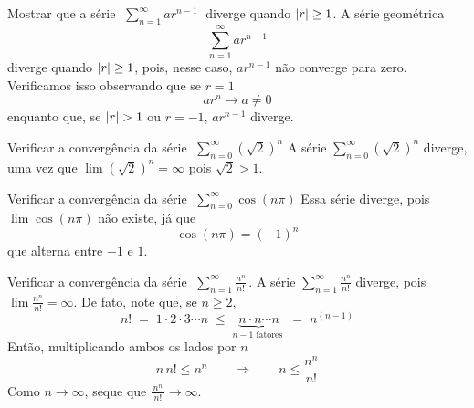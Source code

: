 \begin{example}
  Mostrar que a série
  \(\;
    \sum_{n=1}^\infty ar^{n-1}
  \;\)
  diverge quando $\abs{r}\geq 1$.
  \solution
  A série geométrica
  \[
    \sum_{n=1}^\infty ar^{n-1}
  \]
  diverge quando $\abs{r}\geq 1$, pois, nesse caso, $ar^{n-1}$ não converge para zero.
  Verificamos isso observando que se $r=1$
  \[
    ar^n \to a \neq 0
  \]
  enquanto que, se $\abs{r}>1$ ou $r=-1$, $ar^{n-1}$ diverge.
\end{example}

\begin{example}
  Verificar a convergência da série
  \(\;
    \sum_{n=0}^\infty \left(\sqrt{2}\right)^n
  \)
  \solution
  A série
  \(
    \sum_{n=0}^\infty \left(\sqrt{2}\right)^n
  \)
  diverge, uma vez que
  \(
    \lim \left(\sqrt{2}\right)^n\!\!=\infty
  \)
  pois
  \(
    \sqrt{2}>1
  \).
\end{example}

\begin{example}
  Verificar a convergência da série
  \(\;
    \sum_{n=0}^\infty \cos(n\pi)
  \)
  \solution
  Essa série diverge, pois
  \(
    \lim \cos(n\pi)
  \)
  não existe, já que
  \[
    \cos(n\pi)=(-1)^n
  \]
  que alterna entre $-1$ e $1$.
\end{example}

\begin{example}
  Verificar a convergência da série
  \(\;
    \sum_{n=1}^\infty \frac{n^n}{n!}   \,.
  \)
  \solution
  A série
  \(
    \sum_{n=1}^\infty \frac{n^n}{n!}
  \)
  diverge, pois
  \(
    \lim \frac{n^n}{n!}=\infty
  \).
  De fato, note que, se $n\geq 2$,
  \[ n! \;=\;     1\cdot 2\cdot 3\cdots n
        \;\leq\;  \underbrace{n\cdot n \cdots n}_{n-1 \text{ fatores }}
        \;=\; n^{(n-1)}
  \]
  Então, multiplicando ambos os lados por $n$
  \[
    n\,n!\leq n^{n} \qquad\Rightarrow\qquad n\leq \frac{n^n}{n!}
  \]
  Como $n\to\infty$, seque que
  \(
    \frac{\,n^n\,}{n!}\to \infty
  \).
\end{example}

